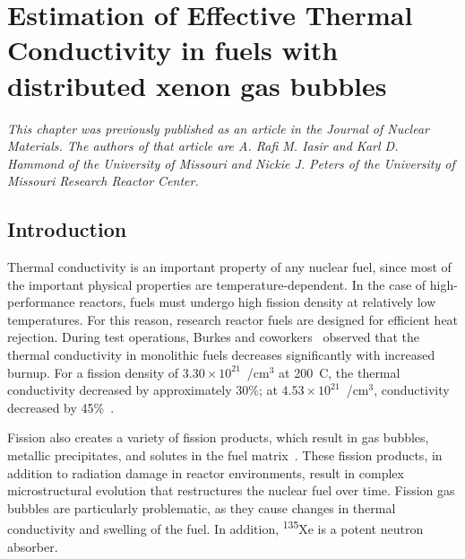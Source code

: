 \chapter{Estimation of Effective Thermal Conductivity in \protect{} fuels with distributed xenon gas bubbles}
\textit{This chapter was previously published as an article in the \textup{Journal of Nuclear Materials}. The authors of that article are A. Rafi M. Iasir and Karl D. Hammond of the University of Missouri and Nickie J. Peters of the University of Missouri Research Reactor Center.}

\section{Introduction}\label{sec:introduction_ch1}
Thermal conductivity is an important property of any nuclear fuel, since most of the important physical properties are temperature-dependent. In the case of high-performance reactors, fuels must undergo high fission density at relatively low temperatures. For this reason, research reactor fuels are designed for efficient heat rejection. During test operations, Burkes and coworkers~\cite{burkes2015thermal} observed that the thermal conductivity in monolithic fuels decreases significantly with increased burnup. For a fission density of $3.30\times10^{21}$~/cm$^{3}$ at 200~\textdegree C, the thermal conductivity decreased by approximately 30\%; at $4.53\times10^{21}$~/cm$^{3}$, conductivity decreased by 45\%~\cite{burkes2015thermal}.

Fission also creates a variety of fission products, which result in gas bubbles, metallic precipitates, and solutes in the fuel matrix~\cite{rondinella2010high}. These fission products, in addition to radiation damage in reactor environments, result in complex microstructural evolution that restructures the nuclear fuel over time. Fission gas bubbles are particularly problematic, as they cause changes in thermal conductivity and swelling of the fuel. In addition, \textsuperscript{135}Xe is a potent neutron absorber.

